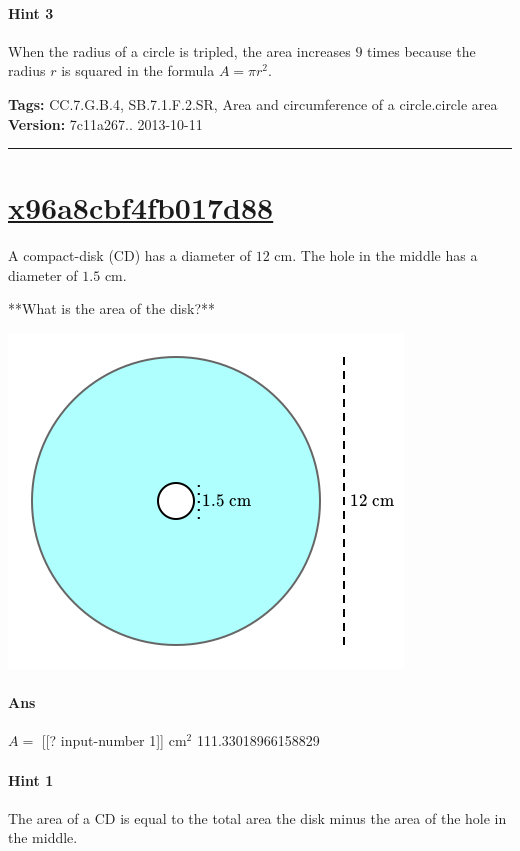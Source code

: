 \documentclass[twocolumn,10pt]{article}
\def\shrinkfactor{0.45}
\begin{document}
\paragraph{Hint 3}When the radius of a circle is tripled, the area increases $9$ times because the radius $r$ is squared in the formula $A=\pi r^2$. 



\medskip
\noindent
\textbf{Tags:} {\footnotesize CC.7.G.B.4, SB.7.1.F.2.SR, Area and circumference of a circle.circle area}\\
\textbf{Version:} 7c11a267.. 2013-10-11
\smallskip\hrule





\section{\href{https://www.khanacademy.org/devadmin/content/items/x96a8cbf4fb017d88}{x96a8cbf4fb017d88}}

\noindent
A compact-disk (CD) has a diameter of $12\text{ cm}$. The hole in the middle has a diameter of $1.5\text{ cm}$. 

**What is the area of the disk?**  


\includegraphics[scale=\shrinkfactor]{figures/fea5db7586f0e819785c674bb2fc6212dda1ce88.png}

\paragraph{Ans} $A =$ [[? input-number 1]] $\text{cm}^2$  111.33018966158829

\paragraph{Hint 1}The area of a CD is equal to the total area the disk minus the area of the hole in the middle.
\end{document}
